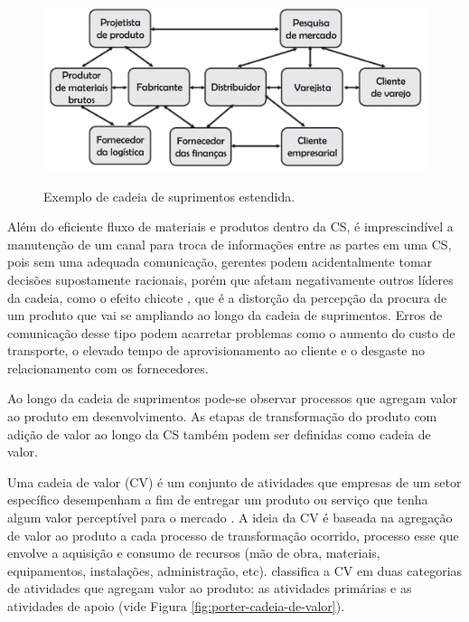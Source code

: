 \documentclass[
	12pt,				%
	oneside,			%
	a4paper,			%
	english,			%
	brazil				%
]{abntex2}
\begin{document}
	\begin{figure}[H]
		\centering
		\caption{Exemplo de cadeia de suprimentos estendida.}
		\includegraphics[width=1\textwidth]{cadeia-de-suprimentos.png}
		\label{fig:cadeia-de-suprimentos}
	\end{figure}

	Além do eficiente fluxo de materiais e produtos dentro da CS, é imprescindível a manutenção de um canal para troca de informações entre as partes em uma CS, pois sem uma adequada comunicação, gerentes podem acidentalmente tomar decisões supostamente racionais, porém que afetam negativamente outros líderes da cadeia, como o efeito chicote \cite{lee1997bullwhip}, que é a distorção da percepção da procura de um produto que vai se ampliando ao longo da cadeia de suprimentos. Erros de comunicação desse tipo podem acarretar problemas como o aumento do custo de transporte, o elevado tempo de aprovisionamento ao cliente e o desgaste no relacionamento com os fornecedores.
	
	Ao longo da cadeia de suprimentos pode-se observar processos que agregam valor ao produto em desenvolvimento. As etapas de transformação do produto com adição de valor ao longo da CS também podem ser definidas como cadeia de valor.
	
	Uma cadeia de valor (CV) é um conjunto de atividades que empresas de um setor específico desempenham a fim de entregar um produto ou serviço que tenha algum valor perceptível para o mercado \cite{porter1985competitiveadvantage}. A ideia da CV é baseada na agregação de valor ao produto a cada processo de transformação ocorrido, processo esse que envolve a aquisição e consumo de recursos (mão de obra, materiais, equipamentos, instalações, administração, etc).  classifica a CV em duas categorias de atividades que agregam valor ao produto: as atividades primárias e as atividades de apoio (vide Figura \ref{fig:porter-cadeia-de-valor}).
	
\end{document}
